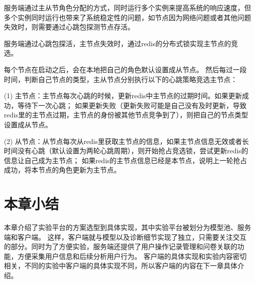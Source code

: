 服务端通过主从节角色分配的方式，同时运行多个实例来提高系统的响应速度，但多个实例同时运行也带来了系统稳定性的问题，如节点因为网络问题或者其他问题失效时，则需要通过心跳包探测节点存活。

服务端通过心跳包探活，主节点失效时，通过redis的分布式锁实现主节点的竞选。

每个节点在启动之后，会在本地把自己的角色默认设置成从节点。
然后每过一段时间，判断自己节点的类型，主从节点分别执行以下的心跳策略竞选主节点：

(1) 主节点：主节点每次心跳的时候，更新redis中主节点的过期时间。如果更新成功，等待下一次心跳； 
如果更新失败（更新失败可能是自己没有及时更新，导致redis里的主节点过期，主节点的身份被其他节点竞争到了），则把自己的节点类型设置成从节点。

(2) 从节点：从节点每次从redis里获取主节点的信息，如果主节点信息无效或者长时间没有心跳（默认设置为两轮心跳周期），则开始抢占竞选锁，尝试更新redis的信息让自己成为主节点；
如果redis的主节点信息已经是本节点，说明上一轮抢占成功，将本节点的角色更新为主节点。


\section{本章小结}
本章介绍了实验平台的方案选型到具体实现，其中实验平台被划分为模型池、服务端和客户端。
这样，客户端就与模型以及诊断细节实现了独立，只需要关注交互的部分。同时为了方便实验，服务端还提供了用户操作记录管理和问卷关联的功能，方便采集用户信息和后续分析用户行为。
客户端的具体实现和实验内容密切相关，不同的实验中客户端的具体实现不同，所以客户端的内容在下一章具体介绍。

